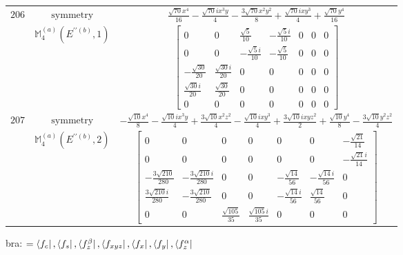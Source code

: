 \documentclass[fleqn,8pt,landscape]{jsarticle}
\begin{document}
\begin{longtable}{ccc}
$ 206 $ & $ \text{symmetry} $ & $ \frac{\sqrt{70} x^{4}}{16} - \frac{\sqrt{70} i x^{3} y}{4} - \frac{3 \sqrt{70} x^{2} y^{2}}{8} + \frac{\sqrt{70} i x y^{3}}{4} + \frac{\sqrt{70} y^{4}}{16} $ \\
$  $ & $ \mathbb{M}_{4}^{(a)}(E^{\prime\prime(b)},1) $ & $ \begin{bmatrix} 0 & 0 & \frac{\sqrt{5}}{10} & - \frac{\sqrt{5} i}{10} & 0 & 0 & 0 \\ 0 & 0 & - \frac{\sqrt{5} i}{10} & - \frac{\sqrt{5}}{10} & 0 & 0 & 0 \\ - \frac{\sqrt{30}}{20} & \frac{\sqrt{30} i}{20} & 0 & 0 & 0 & 0 & 0 \\ \frac{\sqrt{30} i}{20} & \frac{\sqrt{30}}{20} & 0 & 0 & 0 & 0 & 0 \\ 0 & 0 & 0 & 0 & 0 & 0 & 0 \end{bmatrix} $ \\ \hline
$ 207 $ & $ \text{symmetry} $ & $ - \frac{\sqrt{10} x^{4}}{8} - \frac{\sqrt{10} i x^{3} y}{4} + \frac{3 \sqrt{10} x^{2} z^{2}}{4} - \frac{\sqrt{10} i x y^{3}}{4} + \frac{3 \sqrt{10} i x y z^{2}}{2} + \frac{\sqrt{10} y^{4}}{8} - \frac{3 \sqrt{10} y^{2} z^{2}}{4} $ \\
$  $ & $ \mathbb{M}_{4}^{(a)}(E^{\prime\prime(b)},2) $ & $ \begin{bmatrix} 0 & 0 & 0 & 0 & 0 & 0 & - \frac{\sqrt{21}}{14} \\ 0 & 0 & 0 & 0 & 0 & 0 & - \frac{\sqrt{21} i}{14} \\ - \frac{3 \sqrt{210}}{280} & - \frac{3 \sqrt{210} i}{280} & 0 & 0 & - \frac{\sqrt{14}}{56} & - \frac{\sqrt{14} i}{56} & 0 \\ \frac{3 \sqrt{210} i}{280} & - \frac{3 \sqrt{210}}{280} & 0 & 0 & - \frac{\sqrt{14} i}{56} & \frac{\sqrt{14}}{56} & 0 \\ 0 & 0 & \frac{\sqrt{105}}{35} & \frac{\sqrt{105} i}{35} & 0 & 0 & 0 \end{bmatrix} $ \\ \hline
\end{longtable}
bra: $=\bra{f_{c}}, \bra{f_{s}}, \bra{f_{z}^{\beta}}, \bra{f_{xyz}}, \bra{f_{x}}, \bra{f_{y}}, \bra{f_{z}^{\alpha}}$
\end{document}
